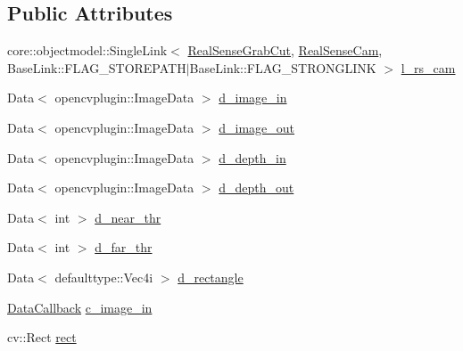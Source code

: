 \subsection*{Public Attributes}
\begin{DoxyCompactItemize}
\item 
core\+::objectmodel\+::\+Single\+Link$<$ \hyperlink{classsofa_1_1rgbdtracking_1_1_real_sense_grab_cut}{Real\+Sense\+Grab\+Cut}, \hyperlink{classsofa_1_1rgbdtracking_1_1_real_sense_cam}{Real\+Sense\+Cam}, Base\+Link\+::\+F\+L\+A\+G\+\_\+\+S\+T\+O\+R\+E\+P\+A\+TH$\vert$Base\+Link\+::\+F\+L\+A\+G\+\_\+\+S\+T\+R\+O\+N\+G\+L\+I\+NK $>$ \hyperlink{classsofa_1_1rgbdtracking_1_1_real_sense_grab_cut_a761ad9c4afbcf2296b04a4431a294616}{l\+\_\+rs\+\_\+cam}
\item 
Data$<$ opencvplugin\+::\+Image\+Data $>$ \hyperlink{classsofa_1_1rgbdtracking_1_1_real_sense_grab_cut_a01f768822f64914b92234b03bd5c9d6f}{d\+\_\+image\+\_\+in}
\item 
Data$<$ opencvplugin\+::\+Image\+Data $>$ \hyperlink{classsofa_1_1rgbdtracking_1_1_real_sense_grab_cut_a2b2daf39abe1d4acf77316a41ada7ac8}{d\+\_\+image\+\_\+out}
\item 
Data$<$ opencvplugin\+::\+Image\+Data $>$ \hyperlink{classsofa_1_1rgbdtracking_1_1_real_sense_grab_cut_adeb52bee3090e991650f8a49b4bec7bd}{d\+\_\+depth\+\_\+in}
\item 
Data$<$ opencvplugin\+::\+Image\+Data $>$ \hyperlink{classsofa_1_1rgbdtracking_1_1_real_sense_grab_cut_a368ca4797dd54ff927e75d9cfc561787}{d\+\_\+depth\+\_\+out}
\item 
Data$<$ int $>$ \hyperlink{classsofa_1_1rgbdtracking_1_1_real_sense_grab_cut_af51a13c31b7b6a22f9e8e5b6f276870a}{d\+\_\+near\+\_\+thr}
\item 
Data$<$ int $>$ \hyperlink{classsofa_1_1rgbdtracking_1_1_real_sense_grab_cut_a8150b5cacf4c223b35a98bb6c78b3b5b}{d\+\_\+far\+\_\+thr}
\item 
Data$<$ defaulttype\+::\+Vec4i $>$ \hyperlink{classsofa_1_1rgbdtracking_1_1_real_sense_grab_cut_a1de3d863a69e379fbfe79756db8ad67c}{d\+\_\+rectangle}
\item 
\hyperlink{namespacesofa_1_1rgbdtracking_a00834a9204a667746fef9a402ccbfb55}{Data\+Callback} \hyperlink{classsofa_1_1rgbdtracking_1_1_real_sense_grab_cut_a5c45fc7332469e7272a01924f8db53cf}{c\+\_\+image\+\_\+in}
\item 
cv\+::\+Rect \hyperlink{classsofa_1_1rgbdtracking_1_1_real_sense_grab_cut_adc07cdbc1f27d1e1d1f189a722b6c99d}{rect}
\end{DoxyCompactItemize}
